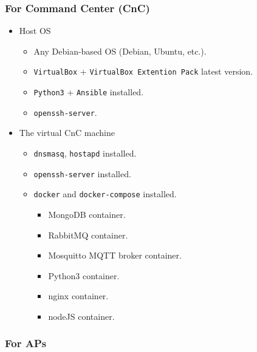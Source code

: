 \hypertarget{for-command-center-cnc}{%
\subsubsection{For Command Center (CnC)}\label{for-command-center-cnc}}

\begin{itemize}
\tightlist
\item
  Host OS

  \begin{itemize}
  \tightlist
  \item
    Any Debian-based OS (Debian, Ubuntu, etc.).
  \item
    \texttt{VirtualBox} + \texttt{VirtualBox\ Extention\ Pack} latest
    version.
  \item
    \texttt{Python3} + \texttt{Ansible} installed.
  \item
    \texttt{openssh-server}.
  \end{itemize}
\item
  The virtual CnC machine

  \begin{itemize}
  \tightlist
  \item
    \texttt{dnsmasq}, \texttt{hostapd} installed.
  \item
    \texttt{openssh-server} installed.
  \item
    \texttt{docker} and \texttt{docker-compose} installed.

    \begin{itemize}
    \tightlist
    \item
      MongoDB container.
    \item
      RabbitMQ container.
    \item
      Mosquitto MQTT broker container.
    \item
      Python3 container.
    \item
      nginx container.
    \item
      nodeJS container.
    \end{itemize}
  \end{itemize}
\end{itemize}

\hypertarget{for-aps}{%
\subsubsection{For APs}\label{for-aps}}

